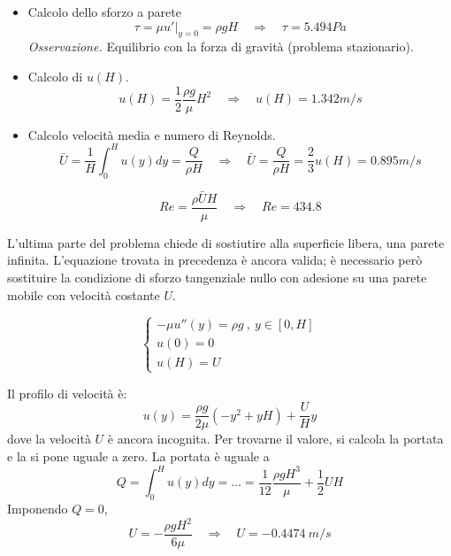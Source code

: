 \begin{itemize}
  \item Calcolo dello sforzo a parete
  \begin{equation}
    \tau = \mu u'|_{y=0} = \rho g H \quad \Rightarrow \quad \tau = 5.494 Pa
  \end{equation}
  \textit{Osservazione.} Equilibrio con la forza di gravità (problema stazionario).
  
  \item Calcolo di $u(H)$.
  \begin{equation}
    u(H) = \frac{1}{2}\frac{\rho g}{\mu} H^2 
    \quad \Rightarrow \quad u(H) = 1.342 m/s
  \end{equation}
  
  \item Calcolo velocità media e numero di Reynolds.
  \begin{equation}
    \bar{U} = \frac{1}{H}\int_{0}^{H} u(y) dy = \frac{Q}{\rho H}
    \quad \Rightarrow \quad \bar{U} = \frac{Q}{\rho H}
                                    = \frac{2}{3}u(H) = 0.895 m/s
  \end{equation}
  
  \begin{equation}
    Re = \frac{\rho \bar{U} H}{\mu}
    \quad \Rightarrow \quad Re = 434.8
  \end{equation}
 
  
\end{itemize}

L'ultima parte del problema chiede di sostiutire alla superficie libera,
 una parete infinita. L'equazione trovata in precedenza è ancora valida;
 è necessario però sostituire la condizione di sforzo tangenziale nullo
 con adesione su una parete mobile con velocità costante $U$.

  \begin{equation}
  \begin{cases}
    - \mu u''(y) = \rho g \ , \ y \in[0,H] \\
    u(0) = 0  \\ u(H) = U
  \end{cases}
  \end{equation}

Il profilo di velocità è:
\begin{equation}
 u(y) = \dfrac{\rho g}{2 \mu}(-y^2 + yH) +\dfrac{U}{H}y
\end{equation}
dove la velocità $U$ è ancora incognita. Per trovarne il valore, si 
calcola la portata e la si pone uguale a zero. La portata è uguale a
\begin{equation}
 Q = \int_0^H u(y) dy = \dots = \dfrac{1}{12}\dfrac{\rho g H^3}{\mu}
 + \dfrac{1}{2}UH
\end{equation}
Imponendo $Q=0$,
\begin{equation}
 U = - \dfrac{\rho g H^2}{6 \mu} \quad \Rightarrow \quad
 U = - 0.4474\ m/s
\end{equation}

